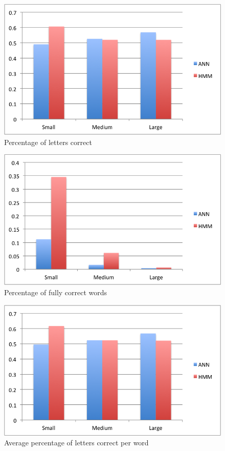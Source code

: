 \documentclass[11pt,a4paper,twocolumn]{article}
\begin{document}
\begin{figure}[h]
\centering
\caption{Percentage of letters correct}
\includegraphics[scale=0.55]{img/lettersCorrect.png}
\end{figure}

\begin{figure}[h]
\centering
\caption{Percentage of fully correct words}
\includegraphics[scale=0.55]{img/wordsCorrect.png}
\end{figure}

\begin{figure}[h]
\centering
\caption{Average percentage of letters correct per word}
\includegraphics[scale=0.55]{img/wordCorrectness.png}
\end{figure}
\end{document}

